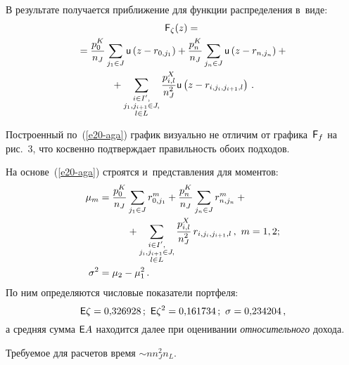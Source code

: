 \begin{multicols}{2}
  
  В результате получается приближение для функции распределения в~виде: 
  \begin{multline}
  {\sf F}_\zeta(z)={}\\
  {}=\displaystyle\frac{\displaystyle p_0^K\mathstrut}{\displaystyle n_J\mathstrut} \sum\limits_{j_1\in J} {\sf u}\left( z-
r_{0,j_1}\right) +\displaystyle\frac{\displaystyle p_n^K\mathstrut}{\displaystyle n_J\mathstrut}\sum\limits_{j_n\in J}  {\sf u}\left( z-
r_{n,j_n}\right)+{}\\
  {}+\sum\limits_{\substack{{i\in I^\prime,}\\ 
  {j_1, j_{i+1}\in J,}\\
  {l\in L}}} \displaystyle\frac{\displaystyle p^X_{i,l}\mathstrut}{\displaystyle n_J^2\mathstrut}{\sf 
u}\left( z-r_{i,j_i, j_{i+1},l}\right)\,.
  \label{e20-aga}
  \end{multline}
  
  Построенный по~(\ref{e20-aga}) график визуально не отличим от 
графика~${\sf F}_f$ на рис.~3, что косвенно подтверждает правильность обоих 
подходов. 
  
  На основе~(\ref{e20-aga}) строятся и~представления для моментов: 
  \begin{align*}
  \mu_m&= \fr{p_0^K}{n_J}\sum\limits_{j_1\in J} r^m_{0,j_1} +\fr{p_n^K}{n_J} 
\sum\limits_{j_n\in J} r^m_{n,j_n}+{}\\
&\hspace*{10mm}{}+\sum\limits_{\substack{{i\in I^\prime,}\\
{j_i, j_{i+1}\in J,}\\
{l\in  L}}} \fr{p^X_{i,l}}{n_J^2}\,r_{i,j_i, j_{i+1},l}\,,\ m=1,2;\\
  \sigma^2&= \mu_2-\mu_1^2\,.
  \end{align*}
  По ним определяются числовые показатели портфеля:
  $$
  {\sf E}\zeta = 0{,}326928\,;\ {\sf E}\zeta^2 = 0{,}161734\,;\ \sigma = 
0{,}234204\,,
  $$
а средняя сумма ${\sf E}A$ находится далее при оценивании 
\textit{относительного} дохода.

  Требуемое для расчетов время $\sim  n n_J^2n_L$.
  

\end{multicols}
